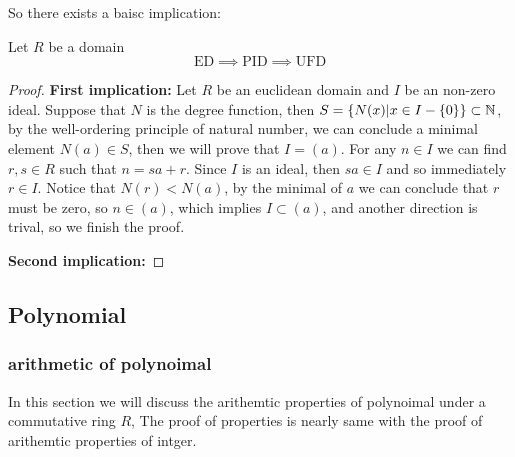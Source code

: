 So there exists a baisc implication:
\begin{proposition}
    Let \(R\) be a domain 
    \[\text{ED} \implies \text{PID} \implies \text{UFD} \]

    \begin{proof}
        \textbf{First implication:} Let \(R\) be an euclidean domain and \(I   \) be an non-zero ideal. Suppose that \(N\) is the degree function, then \(S = \{N(x) | x \in I-\{0\}\} \subset \mathbb{N}\), by the well-ordering principle of natural number, we can conclude a minimal element \(N(a) \in S\), then we will prove that \(I = (a)\). For any \(n \in I\) we can find \(r,s \in R\) such that \(n = sa+r\). Since \(I\) is an ideal, then \(sa \in I\) and so immediately \(r \in I\). Notice that \(N(r) < N(a)\), by the minimal of \(a\) we can conclude that \(r\) must be zero, so \(n \in (a)\), which implies \(I \subset (a)\), and another direction is trival, so we finish the proof.
        
        \textbf{Second implication:}
    \end{proof}
\end{proposition}




\subsection{Polynomial}


\subsubsection{arithmetic of polynoimal}
In this section we will discuss the arithemtic properties of polynoimal under a commutative ring \(R\), The proof of properties is nearly same with the proof of arithemtic properties of intger.

